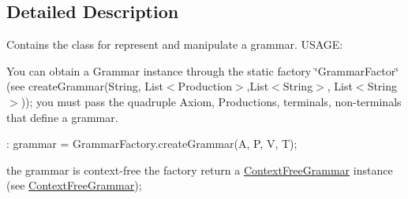 \subsection{Detailed Description}
Contains the class for represent and manipulate a grammar. U\-S\-A\-G\-E\-:\par
 You can obtain a Grammar instance through the static factory \char`\"{}\-Grammar\-Factor\char`\"{} (see create\-Grammar(\-String, List$<$\-Production$>$,\-List$<$\-String$>$, List$<$\-String$>$)); you must pass the quadruple Axiom, Productions, terminals, non-\/terminals that define a grammar. \par
 \-:  grammar = Grammar\-Factory.\-create\-Grammar(\-A, P, V, T); \par
  the grammar is context-\/free the factory return a \hyperlink{classcontext_free_1_1grammar_1_1_context_free_grammar}{Context\-Free\-Grammar} instance (see \hyperlink{classcontext_free_1_1grammar_1_1_context_free_grammar}{Context\-Free\-Grammar}); 
